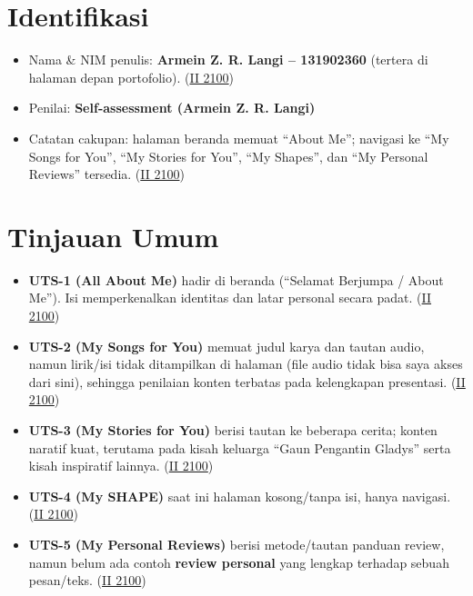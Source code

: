 \documentclass[
  letterpaper,
  DIV=11,
  numbers=noendperiod]{scrreprt}
\providecommand{\tightlist}{%
  \setlength{\itemsep}{0pt}\setlength{\parskip}{0pt}}
\begin{document}
\section{Identifikasi}\label{identifikasi}

\begin{itemize}
\tightlist
\item
  Nama \& NIM penulis: \textbf{Armein Z. R. Langi -- 131902360} (tertera
  di halaman depan portofolio).
  (\href{https://ii-2100.github.io/all-about-me/}{II 2100})
\item
  Penilai: \textbf{Self-assessment (Armein Z. R. Langi)}
\item
  Catatan cakupan: halaman beranda memuat ``About Me''; navigasi ke ``My
  Songs for You'', ``My Stories for You'', ``My Shapes'', dan ``My
  Personal Reviews'' tersedia.
  (\href{https://ii-2100.github.io/all-about-me/}{II 2100})
\end{itemize}

\section{Tinjauan Umum}\label{tinjauan-umum}

\begin{itemize}
\tightlist
\item
  \textbf{UTS-1 (All About Me)} hadir di beranda (``Selamat Berjumpa /
  About Me''). Isi memperkenalkan identitas dan latar personal secara
  padat. (\href{https://ii-2100.github.io/all-about-me/}{II 2100})
\item
  \textbf{UTS-2 (My Songs for You)} memuat judul karya dan tautan audio,
  namun lirik/isi tidak ditampilkan di halaman (file audio tidak bisa
  saya akses dari sini), sehingga penilaian konten terbatas pada
  kelengkapan presentasi.
  (\href{https://ii-2100.github.io/all-about-me/My_Song_for_You/index.html}{II
  2100})
\item
  \textbf{UTS-3 (My Stories for You)} berisi tautan ke beberapa cerita;
  konten naratif kuat, terutama pada kisah keluarga ``Gaun Pengantin
  Gladys'' serta kisah inspiratif lainnya.
  (\href{https://ii-2100.github.io/all-about-me/My_Stories_for_You/index.html}{II
  2100})
\item
  \textbf{UTS-4 (My SHAPE)} saat ini halaman kosong/tanpa isi, hanya
  navigasi.
  (\href{https://ii-2100.github.io/all-about-me/My_Shapes/index.html}{II
  2100})
\item
  \textbf{UTS-5 (My Personal Reviews)} berisi metode/tautan panduan
  review, namun belum ada contoh \textbf{review personal} yang lengkap
  terhadap sebuah pesan/teks.
  (\href{https://ii-2100.github.io/all-about-me/My_Personal_Reviews/index.html}{II
  2100})
\end{itemize}
\end{document}
